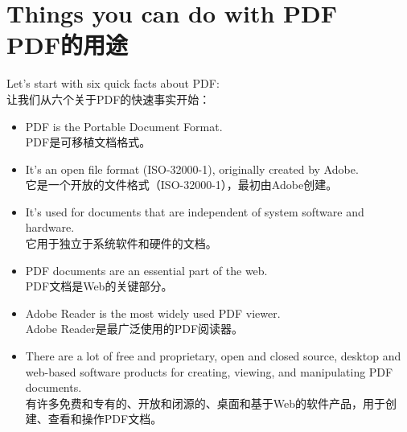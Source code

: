 \documentclass{book}
\begin{document}
\newenvironment{itemizeSum}{%
\begin{itemize}}{\end{itemize}}


\setcounter{chapter}{1}
\section{Things you can do with PDF\\PDF的用途}

Let’s start with six quick facts about PDF:\\让我们从六个关于PDF的快速事实开始：

\begin{itemize}
\item
PDF is the Portable Document Format.\\PDF是可移植文档格式。

\item
It’s an open file format (ISO-32000-1), originally created by Adobe.\\它是一个开放的文件格式（ISO-32000-1），最初由Adobe创建。

\item
It’s used for documents that are independent of system software and hardware.\\它用于独立于系统软件和硬件的文档。

\item
PDF documents are an essential part of the web.\\PDF文档是Web的关键部分。

\item
Adobe Reader is the most widely used PDF viewer.\\Adobe Reader是最广泛使用的PDF阅读器。

\item
There are a lot of free and proprietary, open and closed source, desktop and web-based software products for creating, viewing, and manipulating PDF documents.\\有许多免费和专有的、开放和闭源的、桌面和基于Web的软件产品，用于创建、查看和操作PDF文档。\end{itemize}
\end{document}
